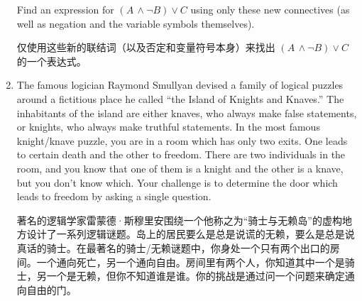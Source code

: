 \begin{enumerate}
    Find an expression for $(A\, \land {\lnot}B) \lor C$
    using only these new connectives (as well as negation and the
    variable symbols themselves).
    
    仅使用这些新的联结词（以及否定和变量符号本身）来找出 $(A\, \land {\lnot}B) \lor C$ 的一个表达式。
    
    \textbookpagebreak
    \workbookpagebreak
    
    
    \item \label{IKK} The famous logician  Raymond Smullyan devised 
    a family of logical puzzles around a fictitious place he called 
     ``the Island of Knights and Knaves.''  The inhabitants of the island are either knaves, who always make false statements, or knights, who always make truthful statements.
    In the most famous knight/knave puzzle, you are in a room which has only two exits.
    One leads to certain death and the other to freedom.
    There are two 
    individuals in the room, and you know that one of them is a knight and the other is a knave, but you don't know which.
    Your challenge is to determine the door which leads to freedom by asking a single question.
    
    著名的逻辑学家雷蒙德·斯穆里安围绕一个他称之为“骑士与无赖岛”的虚构地方设计了一系列逻辑谜题。岛上的居民要么是总是说谎的无赖，要么是总是说真话的骑士。在最著名的骑士/无赖谜题中，你身处一个只有两个出口的房间。一个通向死亡，另一个通向自由。房间里有两个人，你知道其中一个是骑士，另一个是无赖，但你不知道谁是谁。你的挑战是通过问一个问题来确定通向自由的门。
    
    \end{enumerate}